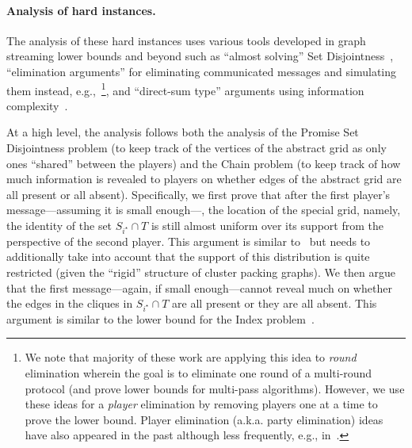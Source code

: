 \documentclass[11pt]{article}
\theoremstyle{definition}
\newcommand{\istar}{\ensuremath{i^{\star}}}
\begin{document}
\paragraph{Analysis of hard instances.}  The analysis of these hard instances uses various tools developed in graph streaming lower bounds and beyond such as 
``almost solving'' Set Disjointness~\cite{AssadiCK19b,AssadiR20,AssadiGLMM24}, ``elimination arguments'' for eliminating communicated messages and simulating them instead, e.g.,~\cite{MiltersenNSW95,GuruswamiO13,AssadiKNS24,AssadiBKNS25}\footnote{We note that majority of these work are applying this idea to \emph{round} elimination wherein the goal is to eliminate one round of a multi-round protocol (and prove lower bounds for multi-pass algorithms). However, we use these ideas for a \emph{player} elimination by removing players one at a time to prove the lower bound. Player elimination (a.k.a. party elimination) ideas have also appeared in the past although less frequently, 
e.g., in~\cite{Chakrabarti07,ViolaW07}.}, and ``direct-sum type'' arguments using information complexity~\cite{ChakrabartiSWY01,Bar-YossefJKS02,BarakBCR10}. 



At a high level, the analysis follows
both the analysis of the Promise Set Disjointness problem (to keep track of the vertices of the abstract grid as only ones ``shared'' between the players) and the Chain problem (to keep track of how much information is revealed to players
on whether edges of the abstract grid are all present or all absent). Specifically, we first prove that after the first player's message---assuming it is small enough---, the location of the special grid, namely, the identity of the set $S_{\istar} \cap T$ is 
still almost uniform over its support from the perspective of the second player. This argument is similar to~\cite{AssadiR20} but needs to additionally take into account that the support of this distribution is quite restricted (given the ``rigid'' structure of cluster packing graphs). We then argue that the first message---again, if small enough---cannot reveal much on whether the edges in the cliques in $S_{\istar} \cap T$ are all present or they are all absent. This argument is similar to the lower bound
for the Index problem~\cite{KNR95}. 
\end{document}
